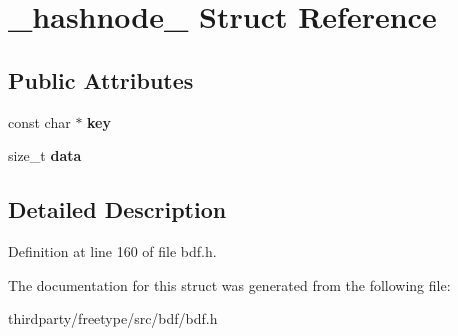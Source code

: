 \hypertarget{struct__hashnode__}{}\section{\+\_\+hashnode\+\_\+ Struct Reference}
\label{struct__hashnode__}
\subsection*{Public Attributes}
\begin{DoxyCompactItemize}
\item 
\mbox{\label{struct__hashnode___a15437a74618824081f0d1b28242f6030}} 
const char $\ast$ {\bfseries key}
\item 
\mbox{\label{struct__hashnode___aa7fb0fc2ac043bb0ecca889865aa7da3}} 
size\+\_\+t {\bfseries data}
\end{DoxyCompactItemize}


\subsection{Detailed Description}


Definition at line 160 of file bdf.\+h.



The documentation for this struct was generated from the following file\+:\begin{DoxyCompactItemize}
\item 
thirdparty/freetype/src/bdf/bdf.\+h\end{DoxyCompactItemize}
